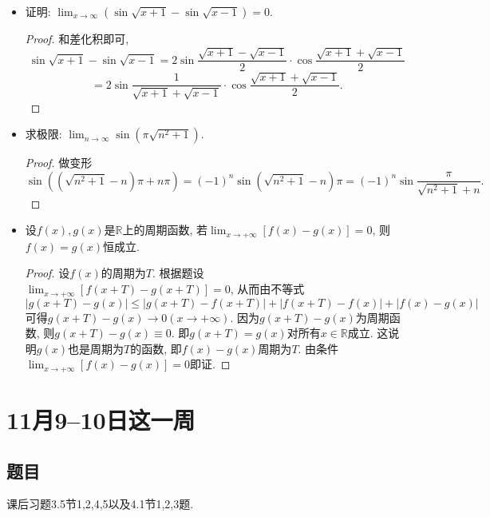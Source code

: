 \documentclass[UTF8,11pt, a4paper, oneside, fontset=none]{ctexbook}
\begin{document}
\begin{itemize}
\item[4.] 证明: $\lim_{x \to \infty}(\sin \sqrt{x+1} - \sin \sqrt{x-1}) =0$.

\begin{proof}
和差化积即可,
\[
\sin \sqrt{x+1} - \sin \sqrt{x-1} = 2 \sin \frac{\sqrt{x+1} - \sqrt{x-1}}{2} \cdot \cos  \frac{\sqrt{x+1} + \sqrt{x-1}}{2}
\]
\[
= 2 \sin \frac{1}{\sqrt{x+1} + \sqrt{x-1}} \cdot \cos  \frac{\sqrt{x+1} + \sqrt{x-1}}{2}.
\]

\end{proof}

\item[5.] 求极限: $\lim_{n \to \infty} \sin(\pi \sqrt{n^2+1})$.


\begin{proof}
做变形
\[
\sin((\sqrt{n^2+1} -n)\pi + n \pi )= (-1)^n \sin (\sqrt{n^2+1} -n)\pi = (-1)^n \sin \frac{\pi}{\sqrt{n^2+1} +n}.
\]

\end{proof}


\item[6.] 设$f(x), g(x)$是$\mathbb R$上的周期函数, 若$\lim_{x \to +\infty}[f(x) -g(x)] =0$, 则$f(x) = g(x)$恒成立.

\begin{proof}
设$f(x)$的周期为$T$. 根据题设$\lim_{x \to +\infty}[f(x+T) -g(x+T)] =0$, 从而由不等式
\[
|g(x+T) - g(x) | \leq |g(x+T) - f(x+T)| + |f(x+T) - f(x)| + |f(x) - g(x)|
\]
可得$g(x+T) - g(x) \to 0 ( x \to +\infty)$. 因为$g(x+T) - g(x)$为周期函数, 则$g(x+T) - g(x) \equiv 0$. 即$g(x+T) = g(x)$对所有$x \in \mathbb R$成立. 这说明$g(x)$也是周期为$T$的函数, 即$f(x) - g(x)$周期为$T$. 由条件$\lim_{x \to +\infty}[f(x) -g(x)] =0$即证.

\end{proof}

\end{itemize}

\clearpage

\section{11月9--10日这一周}

\subsection*{题目}

课后习题3.5节1,2,4,5以及4.1节1,2,3题.
\end{document}
